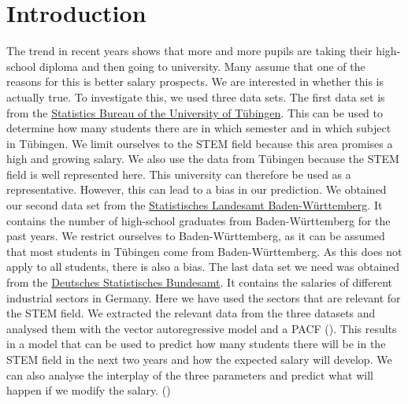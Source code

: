 \documentclass{article}
\theoremstyle{plain}
\theoremstyle{definition}
\theoremstyle{remark}
\begin{document}
\section{Introduction}\label{sec:intro}
The trend in recent years shows that more and more pupils are taking their high-school diploma and then going to university. Many assume that one of the reasons for this is better salary prospects. We are interested in whether this is actually true. To investigate this, we used three data sets. The first data set is from the \href{https://uni-tuebingen.de/einrichtungen/verwaltung/iv-studierende/studierendenabteilung/statistiken/}{Statistics Bureau of the University of Tübingen}. This can be used to determine how many students there are in which semester and in which subject in Tübingen. We limit ourselves to the STEM field because this area promises a high and growing salary. We also use the data from Tübingen because the STEM field is well represented here. This university can therefore be used as a representative. However, this can lead to a bias in our prediction. We obtained our second data set from the \href{https://www.statistik-bw.de/BildungKultur/SchulenAllgem/LRt0302.jsp}{Statistisches Landesamt Baden-Württemberg}. It contains the number of high-school graduates from Baden-Württemberg for the past years. We restrict ourselves to Baden-Württemberg, as it can be assumed that most students in Tübingen come from Baden-Württemberg. As this does not apply to all students, there is also a bias. The last data set we need was obtained from the \href{https://www-genesis.destatis.de/genesis//online?operation=table&code=62321-0001&bypass=true&levelindex=0&levelid=1702307320529#abreadcrumb}{Deutsches Statistisches Bundesamt}. It contains the salaries of different industrial sectors in Germany. Here we have used the sectors that are relevant for the STEM field. We extracted the relevant data from the three datasets and analysed them with the vector autoregressive model and a PACF (). This results in a model that can be used to predict how many students there will be in the STEM field in the next two years and how the expected salary will develop. We can also analyse the interplay of the three parameters and predict what will happen if we modify the salary. ()

\end{document}
